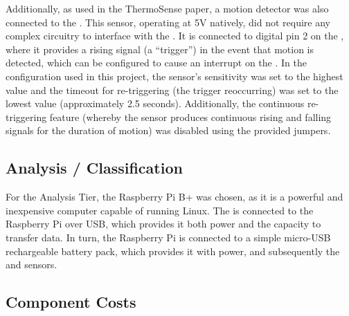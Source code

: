 \documentclass[../thesis/thesis.tex]{subfiles}
\begin{document}
Additionally, as used in the ThermoSense paper, a \pir motion detector \cite{AdafruitPIR} was also connected to the \ard. This sensor, operating at 5V natively, did not require any complex circuitry to interface with the \ard. It is connected to digital pin 2 on the \ard, where it provides a rising signal (a ``trigger'') in the event that motion is detected, which can be configured to cause an interrupt on the \ard. In the configuration used in this project, the sensor's sensitivity was set to the highest value and the timeout for re-triggering (the trigger reoccurring) was set to the lowest value (approximately 2.5 seconds). Additionally, the continuous re-triggering feature (whereby the sensor produces continuous rising and falling signals for the duration of motion) was disabled using the provided jumpers. 

\subsection{Analysis / Classification}

For the Analysis Tier, the Raspberry Pi B+ was chosen, as it is a powerful and inexpensive computer capable of running Linux. The \ard is connected to the Raspberry Pi over USB, which provides it both power and the capacity to transfer data. In turn, the Raspberry Pi is connected to a simple micro-USB rechargeable battery pack, which provides it with power, and subsequently the \ard and sensors.

\subsection{Component Costs}
\label{subsec:cost}
\end{document}
